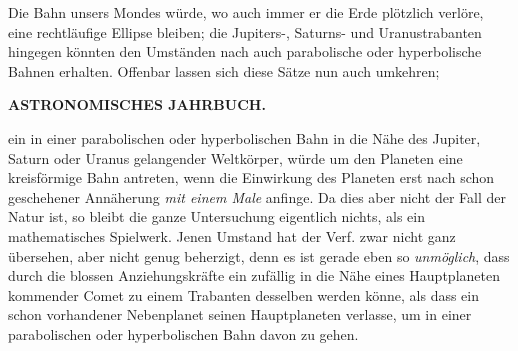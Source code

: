 Die Bahn unsers Mondes würde, wo auch immer er die Erde plötzlich verlöre, eine rechtläufige Ellipse
bleiben; die Jupiters-, Saturns- und Uranustrabanten hingegen könnten den Umständen nach auch parabolische oder hyperbolische Bahnen erhalten. Offenbar lassen sich diese Sätze nun auch umkehren;\par
\clearpage
\thispagestyle{empty}
\noindent{}%
\makebox[12mm][l]{}%
\parbox[t]{\dimexpr\linewidth-24mm\relax}{\centering\footnotesize\bfseries ASTRONOMISCHES JAHRBUCH.\par}%
\par\medskip
\noindent ein in einer parabolischen oder hyperbolischen Bahn in die Nähe des Jupiter, Saturn oder Uranus gelangender Weltkörper, würde um den Planeten eine kreisförmige Bahn antreten, wenn die Einwirkung des Planeten erst nach schon geschehener Annäherung \emph{mit einem Male} anfinge. Da dies aber nicht der Fall der Natur ist, so bleibt die ganze Untersuchung eigentlich nichts, als ein mathematisches Spielwerk. Jenen Umstand hat der Verf. zwar nicht ganz übersehen, aber nicht genug beherzigt, denn es ist gerade eben so \emph{unmöglich}, dass durch die blossen Anziehungskräfte ein zufällig in die Nähe eines Hauptplaneten kommender Comet zu einem Trabanten desselben werden könne, als dass ein schon vorhandener Nebenplanet seinen Hauptplaneten verlasse, um in einer parabolischen oder hyperbolischen Bahn davon zu gehen.
